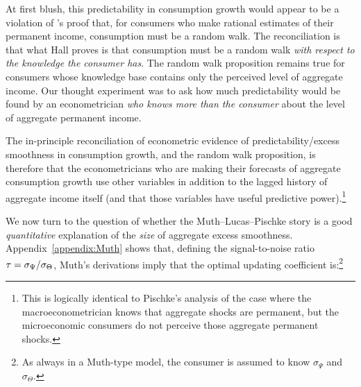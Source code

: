 \documentclass[titlepage]{\econtex}\newcommand{\texname}{cAndCwithStickyE}
\begin{document}
At first blush, this predictability in consumption growth would appear to be a violation of \cite{hallRandomWalk}'s proof that, for consumers who make rational estimates of their permanent income, consumption must be a random walk.  The reconciliation is that what Hall proves is that consumption must be a random walk {\it with respect to the knowledge the consumer has}.  The random walk proposition remains true for consumers whose knowledge base contains only the perceived level of aggregate income.  Our thought experiment was to ask how much predictability would be found by an econometrician {\it who knows more than the consumer} about the level of aggregate permanent income.

The in-principle reconciliation of econometric evidence of predictability/excess smoothness in consumption growth, and the random walk proposition, is therefore that the econometricians who are making their forecasts of aggregate consumption growth use other variables in addition to the lagged history of aggregate income itself (and that those variables have useful predictive power).\footnote{This is logically identical to Pischke's analysis of the case where the macroeconometrician knows that aggregate shocks are permanent, but the microeconomic consumers do not perceive those aggregate permanent shocks.}

We now turn to the question of whether the Muth--Lucas--Pischke story is a good {\it quantitative} explanation of the {\it size} of aggregate excess smoothness.  Appendix~\ref{appendix:Muth} shows that, defining the signal-to-noise ratio $\tau=\sigma_{\Psi}/\sigma_{\Theta}$, Muth's derivations imply that the optimal updating coefficient is:\footnote{As always in a Muth-type model, the consumer is assumed to know $\sigma_{\Psi}$ and $\sigma_{\Theta}$.}  

\providecommand{\PischkePi}{0.83}
\providecommand{\PischkePiCancel}{0.17}
 \providecommand{\fromFile}{false}
 \providecommand{\FileOrNot}{\ifthenelse{\boolean{\fromFile}}}
\end{document}
